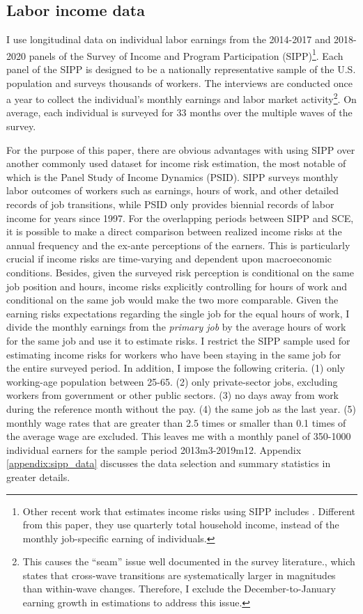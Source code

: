 \subsection{Labor income data}

I use longitudinal data on individual labor earnings from the 2014-2017 and 2018-2020 panels of the Survey of Income and Program Participation (SIPP)\footnote{Other recent work that estimates income risks using SIPP includes \cite{bayer2019precautionary}. Different from this paper, they use quarterly total household income, instead of the monthly job-specific earning of individuals.}. Each panel of the SIPP is designed to be a nationally representative sample of the U.S. population and surveys thousands of workers. The interviews are conducted once a year to collect the individual's monthly earnings and labor market activity\footnote{This causes the ``seam'' issue well documented in the survey literature\citep{moore2008seam}., which states that cross-wave transitions are systematically larger in magnitudes than within-wave changes. Therefore, I exclude the December-to-January earning growth in estimations to address this issue.}. On average, each individual is surveyed for 33 months over the multiple waves of the survey.

For the purpose of this paper, there are obvious advantages with using SIPP over another commonly used dataset for income risk estimation, the most notable of which is the Panel Study of Income Dynamics (PSID). SIPP surveys monthly labor outcomes of workers such as earnings, hours of work, and other detailed records of job transitions, while PSID only provides biennial records of labor income for years since 1997. For the  overlapping periods between SIPP and SCE, it is possible to make a direct comparison between realized income risks at the annual frequency and the ex-ante perceptions of the earners. This is particularly crucial if income risks are time-varying and dependent upon macroeconomic conditions. Besides, given the surveyed risk perception is conditional on the same job position and hours, income risks explicitly controlling for hours of work and conditional on the same job would make the two more comparable.   
Given the earning risks expectations regarding the single job for the equal hours of work, I divide the monthly earnings from the \emph{primary job} by the average hours of work for the same job and use it to estimate risks. I restrict the SIPP sample used for estimating income risks for workers who have been staying in the same job for the entire surveyed period. In addition, I impose the following criteria. (1) only working-age population between 25-65. (2) only private-sector jobs, excluding workers from government or other public sectors. (3) no days away from work during the reference month without the pay. (4) the same job as the last year. (5) monthly wage rates that are greater than 2.5 times or smaller than 0.1 times of the average wage are excluded. This leaves me with a monthly panel of 350-1000 individual earners for the sample period 2013m3-2019m12. Appendix \ref{appendix:sipp_data} discusses the data selection and summary statistics in greater details. 